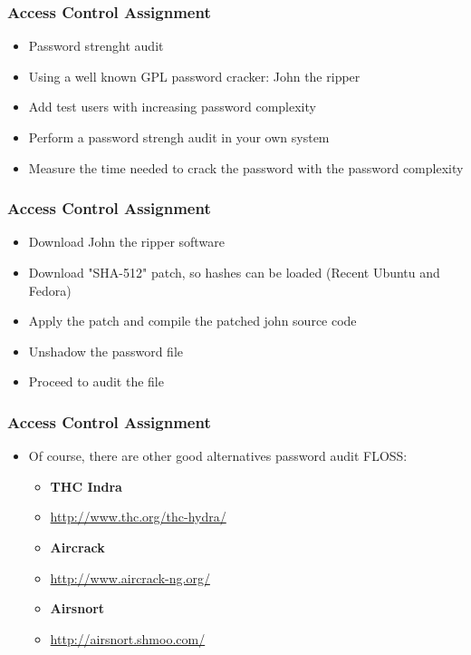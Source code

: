 \documentclass{beamer}
\begin{document}
\begin{frame}

\frametitle{Access Control Assignment}
\begin{itemize}
\item Password strenght audit
\item Using a well known GPL password cracker: John the ripper
\item Add test users with increasing password complexity
\item Perform a password strengh audit in your own system
\item Measure the time needed to crack the password with the password complexity
\end{itemize}

\end{frame}


\begin{frame}

\frametitle{Access Control Assignment}
\begin{itemize}
\item Download John the ripper software
\item Download "SHA-512" patch, so hashes can be loaded (Recent Ubuntu and Fedora)
\item Apply the patch and compile the patched john source code
\item Unshadow the password file 
\item Proceed to audit the file
\end{itemize}

\end{frame}


\begin{frame}

\frametitle{Access Control Assignment}
\begin{itemize}
\item Of course, there are other good alternatives password audit FLOSS:
   \begin{itemize}
   \item {\bf THC Indra}
   \item \url{http://www.thc.org/thc-hydra/}
   \item {\bf Aircrack}
   \item \url{http://www.aircrack-ng.org/}
   \item {\bf Airsnort}
   \item \url{http://airsnort.shmoo.com/}
   \end{itemize}
\end{itemize}

\end{frame}
\end{document}
